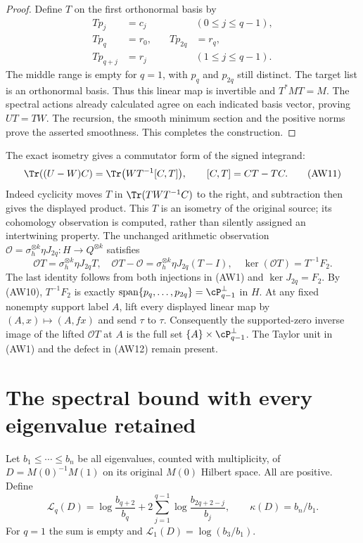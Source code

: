 \documentclass[10pt,a4paper,oneside]{report}
\begin{document}
\begin{proof}
Define $T$ on the first orthonormal basis by
\[
 \begin{aligned}
 Tp_j&=c_j&& (0\le j\le q-1),\\
 Tp_q&=r_0,&\quad Tp_{2q}&=r_q,\\
 Tp_{q+j}&=r_j&& (1\le j\le q-1).
 \end{aligned}
 \tag{AW10}
\]
The middle range is empty for $q=1$, with $p_q$ and $p_{2q}$
still distinct. The target list is an orthonormal basis. Thus this
linear map is invertible and $T^*MT=M$. The spectral actions
already calculated agree on each indicated basis vector, proving
$UT=TW$. The recursion, the smooth minimum section and the positive
norms prove the asserted smoothness. This completes the construction.
\end{proof}

The exact isometry gives a commutator form of the signed integrand:
\[
 \Tr((U-W)C)=\Tr\bigl(WT^{-1}[C,T]\bigr),
 \qquad [C,T]=CT-TC.
 \tag{AW11}
\]
Indeed cyclicity moves $T$ in $\Tr(TWT^{-1}C)$ to the right,
and subtraction then gives the displayed product.
This $T$ is an isometry of the original source; its cohomology
observation is computed, rather than silently assigned an
intertwining property. The unchanged arithmetic observation
$\mathcal O=\sigma_h^{\otimes k}\eta J_{2q}:H\to Q^{\otimes k}$
satisfies
\[
 \mathcal O T=\sigma_h^{\otimes k}\eta J_{2q}T,
 \quad \mathcal O T-\mathcal O
       =\sigma_h^{\otimes k}\eta J_{2q}(T-I),
 \quad \ker(\mathcal O T)=T^{-1}F_2.
 \tag{AW12}
\]
The last identity follows from both injections in (AW1) and
$\ker J_{2q}=F_2$. By (AW10), $T^{-1}F_2$ is exactly
$\operatorname{span}\{p_q,\ldots,p_{2q}\}
=\cP_{q-1}^{\perp}$ in $H$.
At any fixed nonempty support label $A$, lift every displayed
linear map by $(A,x)\mapsto(A,fx)$ and send $\tau$ to $\tau$.
Consequently the supported-zero inverse image of the lifted
$\mathcal O T$ at $A$ is the full set
$\{A\}\times\cP_{q-1}^{\perp}$. The Taylor unit in (AW1)
and the defect in (AW12) remain present.

\section{The spectral bound with every eigenvalue retained}

Let $b_1\le\cdots\le b_n$ be all eigenvalues, counted with
multiplicity, of $D=M(0)^{-1}M(1)$ on its original $M(0)$
Hilbert space. All are positive. Define
\[
 \mathcal L_q(D)=\log\frac{b_{q+2}}{b_q}
       +2\sum_{j=1}^{q-1}\log\frac{b_{2q+2-j}}{b_j},
 \qquad \kappa(D)=b_n/b_1.
 \tag{AW13}
\]
For $q=1$ the sum is empty and $\mathcal L_1(D)=\log(b_3/b_1)$.
\end{document}
